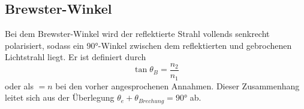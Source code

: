 \subsection{Brewster-Winkel}
\label{subsec:brewster}
Bei dem Brewster-Winkel wird der reflektierte Strahl vollends senkrecht polarisiert, 
sodass ein 90°-Winkel zwischen dem reflektierten und gebrochenen Lichtstrahl
liegt. Er ist definiert durch
\begin{equation}
    \label{eqn:8}
    \tan{\theta_B} = \frac{n_2}{n_1}
\end{equation}
oder als $=n$ bei den vorher angesprochenen Annahmen. Dieser Zusammenhang leitet 
sich aus der Überlegung $\theta_e + \theta_{Brechung} = 90°$ ab.
